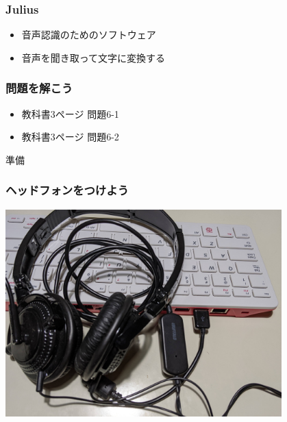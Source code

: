 \documentclass[14pt]{beamer}
\begin{document}
\begin{frame}
\end{frame}

\begin{frame}
  \frametitle{Julius}
  \begin{itemize}
    \item 音声認識のためのソフトウェア
    \item 音声を聞き取って文字に変換する
  \end{itemize}
  \centering
  
\end{frame}

\begin{frame}
  \frametitle{問題を解こう}
  \begin{itemize}
    \item 教科書3ページ 問題6-1
    \item 教科書3ページ 問題6-2
  \end{itemize}
\end{frame}

\begin{frame}
  \centering
  {\Large 準備}
\end{frame}

\begin{frame}
  \frametitle{ヘッドフォンをつけよう}
  \centering
  \includegraphics[width=0.8\textwidth]{how_to_connect_headset.jpg}
\end{frame}
\end{document}
